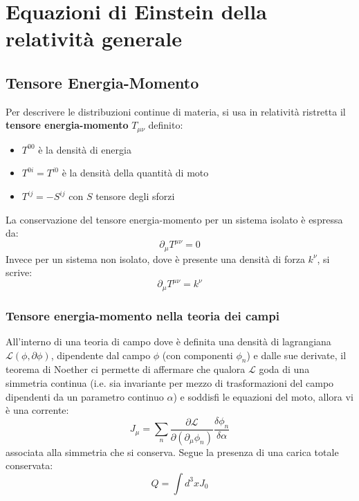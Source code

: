 \chapter{Equazioni di Einstein della relatività generale}
\section{Tensore Energia-Momento}
Per descrivere le distribuzioni continue di materia, si usa in relatività ristretta il \textbf{tensore energia-momento} $T_{\mu\nu}$ definito:
\begin{itemize}
    \item $T^{00}$ è la densità di energia
    \item $T^{0i}=T^{i0}$ è la densità della quantità di moto
    \item $T^{ij}=-S^{ij}$ con $S$ tensore degli sforzi 
\end{itemize}
La conservazione del tensore energia-momento per un sistema isolato è espressa da:
\begin{equation*}
    \partial_\mu T^{\mu\nu} = 0
\end{equation*}
Invece per un sistema non isolato, dove è presente una densità di forza $k^\nu$, si scrive:
\begin{equation*}
    \partial_\mu T^{\mu\nu} = k^\nu
\end{equation*}

\subsection{Tensore energia-momento nella teoria dei campi}
All'interno di una teoria di campo dove è definita una densità di lagrangiana $\mathcal{L}(\phi, \partial \phi)$, dipendente dal campo $\phi$ (con componenti $\phi_n$) e dalle sue derivate, il teorema di Noether ci permette di affermare che qualora $\mathcal{L}$ goda di una simmetria continua (i.e. sia invariante per mezzo di trasformazioni del campo dipendenti da un parametro continuo $\alpha$) e soddisfi le equazioni del moto, allora vi è una corrente:
\begin{equation*}
    J_\mu = \sum_n \frac{\partial \mathcal{L}}{\partial (\partial_\mu \phi_n)}\frac{\delta \phi_n}{\delta \alpha}
\end{equation*}
associata alla simmetria che si conserva. Segue la presenza di una carica totale conservata:
\begin{equation*}
    Q = \int d^3 x J_0
\end{equation*}

